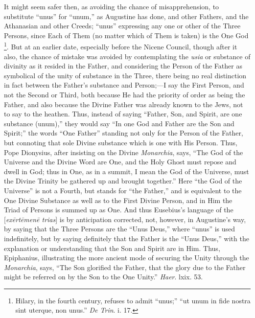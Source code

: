 It might seem safer then, as avoiding the chance of
misapprehension, to substitute ``unus'' for ``unum,''
as Augustine has done, and other Fathers, and the Athanasian and other
Creeds; ``unus'' expressing any one or other of the Three
Persons, since Each of Them (no matter which of Them is taken) is the
One God \footnote{Hilary, in the
fourth century, refuses to admit ``unus;'' ``ut unum in
fide nostra sint uterque, non unus.'' \emph{De Trin}. i. 17.}. But
at an earlier date, especially before the Nicene Council, though after
it also, the chance of mistake was avoided by contemplating the \emph{usia}
or substance of divinity as it resided in the Father, and considering
the Person of the Father as symbolical of the unity of substance in
the Three, there being no real distinction in fact between the Father's
substance and Person;—I say the First Person, and not the Second or
Third, both because He had the priority of order as being the Father,
and also because the Divine Father was already known to the Jews, not
to say to the heathen. Thus, instead of saying ``Father, Son, and
Spirit, are one substance (unum),'' they would say ``In
one God and Father are the Son and Spirit;'' the words ``One
Father'' standing not only for the Person of the Father, but
connoting that sole Divine substance which is one with His Person.
Thus, Pope Dionysius, after insisting on the Divine \emph{Monarchia},
says, ``The God of the Universe and the Divine Word are One, and
the Holy Ghost must repose and dwell in God; thus in One, as in a
summit, I mean the God of the Universe, must the Divine Trinity be
gathered up and brought together.'' Here ``the God of the
Universe'' is not a Fourth, but stands for ``the Father,''
and is equivalent to the One Divine Substance as well as to the First
Divine Person, and in Him the Triad of Persons is summed up as One.
And thus Eusebius's language of the [\emph{ex\={e}rt\={e}men\={e}
trias}] is by anticipation corrected, not, however, in Augustine's
way, by saying that the Three Persons are the ``Unus Deus,''
where ``unus'' is used indefinitely, but by saying definitely
that the Father is the ``Unus Deus,'' with the explanation or
understanding that the Son and Spirit are in Him. Thus, Epiphanius,
illustrating the more ancient mode of securing the Unity through the \emph{Monarchia},
says, ``The Son glorified the Father, that the glory due to the
Father might be referred on by the Son to the One Unity.'' \emph{Haer}.
lxix. 53.

